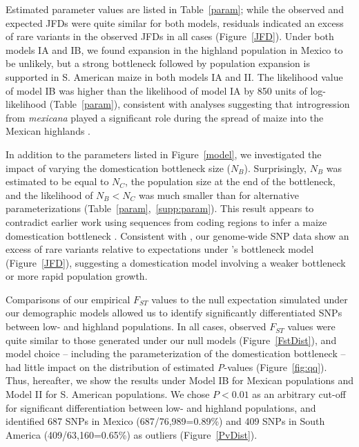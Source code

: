 Estimated parameter values are listed in Table~\ref{param}; while the observed and expected JFDs were quite similar for both models,  residuals indicated an excess of rare variants in the observed JFDs in all cases (Figure~\ref{JFD}). 
Under both models IA and IB,  we found expansion in the highland population in Mexico to be unlikely, but a strong bottleneck followed by population expansion is supported in S. American maize in both models IA and II.  
The likelihood value of model IB was higher than the likelihood of model IA by 850 units of log-likelihood (Table~\ref{param}), consistent with analyses suggesting that introgression from \textit{mexicana} played a significant role during the spread of maize into the Mexican highlands \cite[]{Profford_2013}. 

In addition to the parameters listed in Figure~\ref{model}, we investigated the impact of varying the domestication bottleneck size ($N_B$).  
Surprisingly, $N_B$ was estimated to be equal to $N_C$, the population size at the end of the bottleneck, and the likelihood of $N_B<N_C$ was much smaller than for alternative parameterizations (Table~\ref{param},~\ref{supp:param}). This result appears to contradict earlier work using sequences from coding regions to infer a maize domestication bottleneck \cite[]{Eyre-Walker_1998_9539756,Tenaillon_2004_15014173,Wright_2005_15919994}.  
Consistent with \citet{Hufford_2012_22660546}, our genome-wide SNP data show an excess of rare variants relative to expectations under \cite{Wright_2005_15919994}'s bottleneck model (Figure~\ref{JFD}), suggesting a domestication model involving a weaker bottleneck or more rapid population growth.

Comparisons of our empirical $F_{ST}$ values to the null expectation simulated under our demographic models allowed us to identify significantly differentiated SNPs between low- and highland populations. In all cases, observed $F_{ST}$ values were quite similar to those generated under our null models (Figure~\ref{FstDist}), and model choice -- including the parameterization of the domestication bottleneck -- had little impact on the distribution of estimated \emph{P}-values (Figure~\ref{fig:qq}). 
Thus, hereafter, we show the results under Model IB for Mexican populations and Model II for S. American populations.
We chose $P<0.01$ as an arbitrary cut-off for significant differentiation between low- and highland populations, and identified 687 SNPs in Mexico (687/76,989=0.89\%) and 409 SNPs in South America (409/63,160=0.65\%) as outliers (Figure~\ref{PvDist}).


